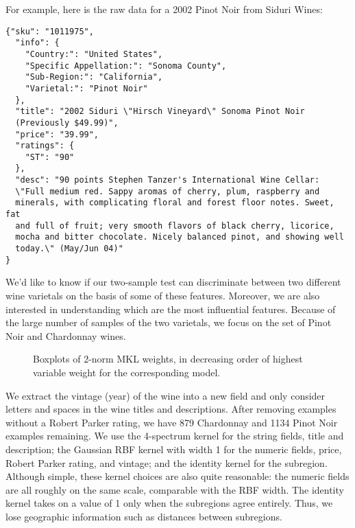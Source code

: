 For example, here is the raw data for a 2002 Pinot Noir from Siduri Wines:
\begin{verbatim}
{"sku": "1011975",
  "info": {
    "Country:": "United States",
    "Specific Appellation:": "Sonoma County",
    "Sub-Region:": "California",
    "Varietal:": "Pinot Noir"
  },
  "title": "2002 Siduri \"Hirsch Vineyard\" Sonoma Pinot Noir
  (Previously $49.99)",
  "price": "39.99",
  "ratings": {
    "ST": "90"
  },
  "desc": "90 points Stephen Tanzer's International Wine Cellar:
  \"Full medium red. Sappy aromas of cherry, plum, raspberry and
  minerals, with complicating floral and forest floor notes. Sweet, fat
  and full of fruit; very smooth flavors of black cherry, licorice,
  mocha and bitter chocolate. Nicely balanced pinot, and showing well
  today.\" (May/Jun 04)"
}
\end{verbatim}

We'd like to know if our two-sample test can discriminate between
two different wine varietals on the basis of some of these features.
Moreover, we are also interested in understanding which are the most
influential features.  Because of the large number of samples of the
two varietals, we focus on the set of Pinot Noir and Chardonnay wines.

\begin{figure}
  \begin{center}
    \resizebox{14.0cm}{!}{
      
    }
  \end{center}
\caption{Boxplots of 2-norm MKL weights, in decreasing order of
  highest variable weight for the corresponding model.}
\label{fig:wine_weights}
\end{figure}

We extract the vintage (year) of the wine into a new field and only consider
letters and spaces in the wine titles and descriptions.  After
removing examples without a Robert Parker rating, we have 879
Chardonnay and 1134 Pinot Noir examples remaining.  We use the
4-spectrum kernel for the string fields, title and description; the
Gaussian RBF kernel with width 1 for the numeric fields, price, Robert
Parker rating, and vintage; and the identity kernel for the
subregion.  Although simple, these kernel choices are also quite
reasonable: the numeric fields are all roughly on the same scale,
comparable with the RBF width.  The identity kernel takes on a value
of 1 only when the subregions agree entirely.  Thus, we lose
geographic information such as distances between subregions.


